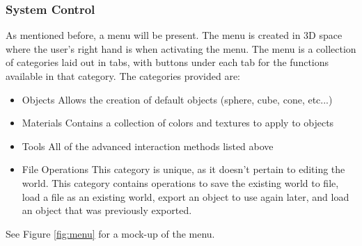 \subsubsection{System Control}
\label{Design:Interaction:SystemControl}
As mentioned before, a menu will be present.
The menu is created in 3D space where the user's right hand is when activating the menu.
The menu is a collection of categories laid out in tabs, with buttons under each tab for the functions available in that category.
The categories provided are:
\begin{itemize}
	\item Objects
	\subitem Allows the creation of default objects (sphere, cube, cone, etc...)
	\item Materials
	\subitem Contains a collection of colors and textures to apply to objects
	\item Tools
	\subitem All of the advanced interaction methods listed above
	\item File Operations
	\subitem This category is unique, as it doesn't pertain to editing the world.  This category contains operations to save the existing world to file, load a file as an existing world, export an object to use again later, and load an object that was previously exported.
\end{itemize}


See Figure \ref{fig:menu} for a mock-up of the menu.

